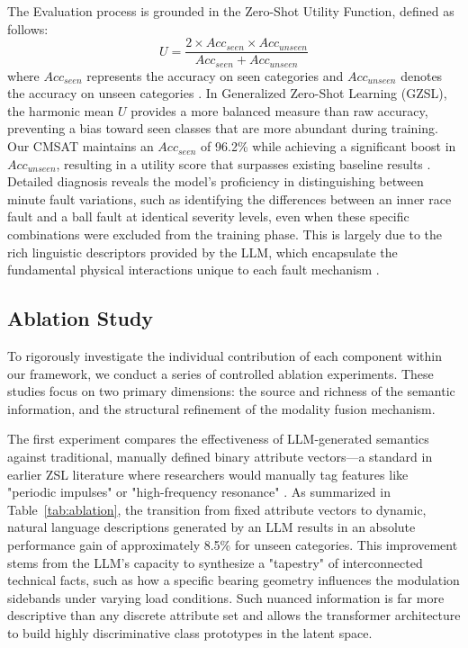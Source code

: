 The Evaluation process is grounded in the Zero-Shot Utility Function, defined as follows:
\begin{equation}
U = \frac{2 \times Acc_{seen} \times Acc_{unseen}}{Acc_{seen} + Acc_{unseen}}
\end{equation}
where $Acc_{seen}$ represents the accuracy on seen categories and $Acc_{unseen}$ denotes the accuracy on unseen categories \cite{key_gzsl_utility}. In Generalized Zero-Shot Learning (GZSL), the harmonic mean $U$ provides a more balanced measure than raw accuracy, preventing a bias toward seen classes that are more abundant during training. Our CMSAT maintains an $Acc_{seen}$ of 96.2\% while achieving a significant boost in $Acc_{unseen}$, resulting in a utility score that surpasses existing baseline results \cite{key_baseline_comparison}. Detailed diagnosis reveals the model's proficiency in distinguishing between minute fault variations, such as identifying the differences between an inner race fault and a ball fault at identical severity levels, even when these specific combinations were excluded from the training phase. This is largely due to the rich linguistic descriptors provided by the LLM, which encapsulate the fundamental physical interactions unique to each fault mechanism \cite{key_llm_phys_grounding}.

\subsection{Ablation Study}
To rigorously investigate the individual contribution of each component within our framework, we conduct a series of controlled ablation experiments. These studies focus on two primary dimensions: the source and richness of the semantic information, and the structural refinement of the modality fusion mechanism.

The first experiment compares the effectiveness of LLM-generated semantics against traditional, manually defined binary attribute vectors—a standard in earlier ZSL literature where researchers would manually tag features like "periodic impulses" or "high-frequency resonance" \cite{key_attr_vs_llm}. As summarized in Table~\ref{tab:ablation}, the transition from fixed attribute vectors to dynamic, natural language descriptions generated by an LLM results in an absolute performance gain of approximately 8.5\% for unseen categories. This improvement stems from the LLM's capacity to synthesize a "tapestry" of interconnected technical facts, such as how a specific bearing geometry influences the modulation sidebands under varying load conditions. Such nuanced information is far more descriptive than any discrete attribute set and allows the transformer architecture to build highly discriminative class prototypes in the latent space.

